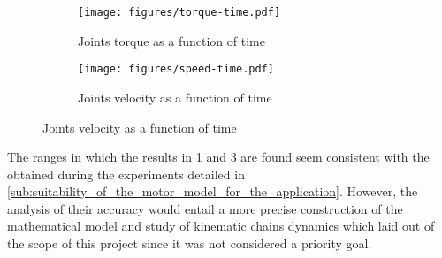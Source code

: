 \begin{figure}[h]
    \centering
    \begin{subfigure}{0.49\textwidth}
        \texttt{[image: figures/torque-time.pdf]}
		\caption{Joints torque as a function of time}
		\label{fig:controller_torque}
	\end{subfigure}	
    \begin{subfigure}{0.49\textwidth}
        \texttt{[image: figures/speed-time.pdf]}
		\caption{Joints velocity as a function of time}
		\label{fig:controller_speed}
    \end{subfigure}
\end{figure}

The ranges in which the results in \ref{fig:controller_torque} and \ref{fig:controller_speed} are found seem consistent with the obtained during the experiments detailed in \ref{sub:suitability_of_the_motor_model_for_the_application}.
However, the analysis of their accuracy would entail a more precise construction of the mathematical model and study of kinematic chains dynamics which laid out of the scope of this project since it was not considered a priority goal.

